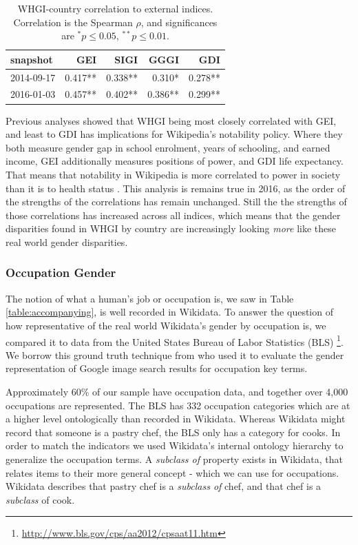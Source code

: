 \documentclass{sig-alternate-05-2015}
\begin{document}
\begin{table}
\caption{WHGI-country correlation to external indices. Correlation is the Spearman $\rho$, and significances are $ ^*p\leq 0.05 $, $ ^{**}p\leq 0.01$.}
\label{table:scores}
\begin{tabular}{lrrrr}
\toprule
snapshot &  GEI &  SIGI &  GGGI &  GDI  \\
\midrule
2014-09-17 &  0.417** &       0.338** &          0.310* &         0.278**  \\
2016-01-03 &  0.457** &       0.402** &          0.386** &         0.299**  \\
\bottomrule
\end{tabular}
\end{table}

Previous analyses showed that WHGI being most closely correlated with  GEI, and least to GDI has implications for Wikipedia's notability policy. Where they both measure gender gap in school enrolment, years of schooling, and earned income, GEI additionally measures positions of power, and GDI life expectancy. That means that notability in Wikipedia is more correlated to power in society than it is to health status \cite{BLINDED}. This analysis is remains true in 2016, as the order of the strengths of the correlations has remain unchanged. Still the the strengths of those correlations has increased across all indices, which means that the gender disparities found in WHGI by country are increasingly looking \textit{more} like these real world gender disparities.


\subsubsection{Occupation Gender}
The notion of what a human's job or occupation is, we saw in Table \ref{table:accompanying}, is well recorded in Wikidata. To answer the question of how representative of the real world Wikidata's gender by occupation is, we compared it to data from the United States Bureau of Labor Statistics (BLS) \footnote{\url{http://www.bls.gov/cps/aa2012/cpsaat11.htm}}. We borrow this ground truth technique from \cite{kay_unequal_2015} who used it to evaluate the gender representation of Google image search results for occupation key terms.

Approximately 60\% of our sample have occupation data, and together over 4,000 occupations are represented. The BLS has 332 occupation categories which are at a higher level ontologically than  recorded in Wikidata. Whereas Wikidata might record that someone is a pastry chef, the BLS only has a category for cooks. In order to match the indicators we used Wikidata's internal ontology hierarchy to generalize the occupation terms. A \textit{subclass of} property exists in Wikidata, that relates items to their more general concept - which we can use for occupations. Wikidata describes that pastry chef is a \textit{subclass of} chef, and that chef is a \textit{subclass} of cook. 
\end{document}
